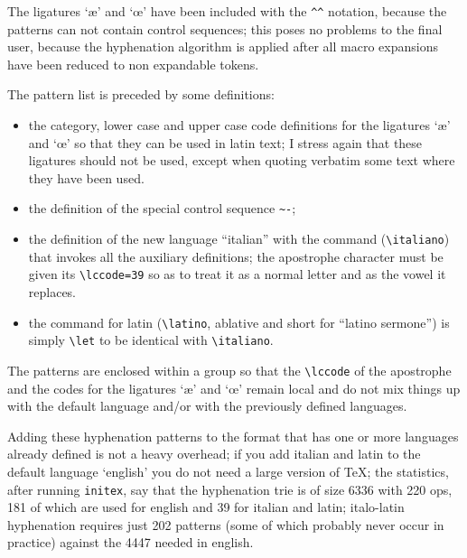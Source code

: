 \documentclass{ltugboat}
\let \italiano\relax \let\latino\relax
\begin{document}
The  ligatures  `\ae'  and  `\oe'  have  been  included  with  the \verb|^^|
notation, because the patterns can not contain control sequences; this poses
no  problems to the final user, because the hyphenation algorithm is applied
after all macro expansions have been reduced to non expandable tokens.

The pattern list is preceded by some definitions:
\begin{itemize}

\item  the  category,  lower  case  and  upper case code definitions for the
ligatures `\ae' and `\oe' so that they can be used in latin text;  I  stress
again  that these ligatures should not be used, except when quoting verbatim
some text where they have been used.

\item the definition of the special control sequence \verb|~-|;

\item  the  definition  of  the  new  language  ``italian'' with the command
(\verb|\italiano|)  that  invokes  all  the  auxiliary   definitions;    the
apostrophe  character  must be given its \verb"\lccode=39" so as to treat it
as a normal letter and as the vowel it replaces.


\item the command for latin (\verb'\latino', ablative and short for ``latino
sermone'') is simply \verb'\let' to be identical with \verb'\italiano'.

\end{itemize}

The  patterns  are enclosed within a group so that the \verb'\lccode' of the
apostrophe and the codes for the ligatures `\ae' and `\oe' remain local  and
do  not  mix  things up with the default language and/or with the previously
defined languages.

Adding  these  hyphenation  patterns  to  the  format  that  has one or more
languages already defined is not a heavy overhead; if you  add  italian  and
latin  to  the default language `english' you do not need a large version of
\TeX; the statistics, after running {\tt initex}, say that  the  hyphenation
trie  is of size 6336 with 220 ops, 181 of which are used for english and 39
for italian and latin; italo-latin hyphenation requires  just  202  patterns
(some  of which probably never occur in practice) against the 4447 needed in
english.
\end{document}

